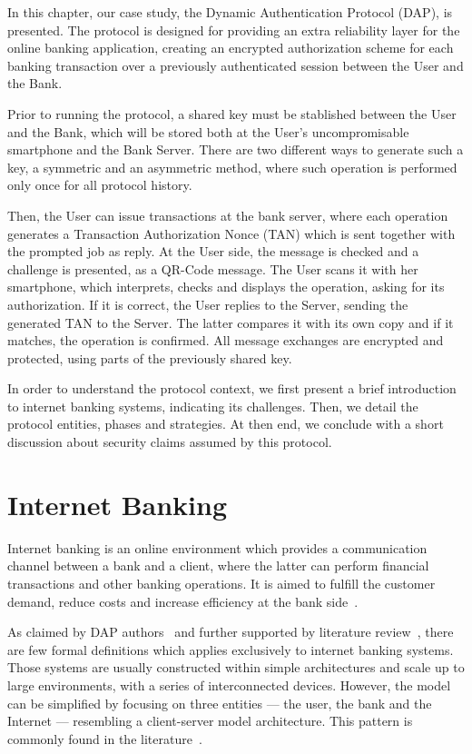 In this chapter\label{chap:dap}, our case study, the Dynamic Authentication Protocol (DAP), is presented. The protocol is designed for providing an extra reliability layer for the online banking application, creating an encrypted authorization scheme for each banking transaction over a previously authenticated session between the User and the Bank.

Prior to running the protocol, a shared key must be stablished between the User and the Bank, which will be stored both at the User's uncompromisable smartphone and the Bank Server. There are two different ways to generate such a key, a symmetric and an asymmetric method, where such operation is performed only once for all protocol history.

Then, the User can issue transactions at the bank server, where each operation generates a Transaction Authorization Nonce (TAN) which is sent together with the prompted job as reply. At the User side, the message is checked and a challenge is presented, as a QR-Code message. The User scans it with her smartphone, which interprets, checks and displays the operation, asking for its authorization. If it is correct, the User replies to the Server, sending the generated TAN to the Server. The latter compares it with its own copy and if it matches, the operation is confirmed. All message exchanges are encrypted and protected, using parts of the previously shared key.

In order to understand the protocol context, we first present a brief introduction to internet banking systems, indicating its challenges. Then, we detail the protocol entities, phases and strategies. At then end, we conclude with a short discussion about security claims assumed by this protocol.





\section{Internet Banking}
Internet banking is an online environment which provides a communication channel between a bank and a client, where the latter can perform financial transactions and other banking operations. It is aimed to fulfill the customer demand, reduce costs and increase efficiency at the bank side~\cite{Hutchinson2003}.

As claimed by DAP authors~\cite[p.8]{Peotta2012} and further supported by literature review~\cite{Hutchinson2003}, there are few formal definitions which applies exclusively to internet banking systems. Those systems are usually constructed within simple architectures and scale up to large environments, with a series of interconnected devices. However, the model can be simplified by focusing on three entities --- the user, the bank and the Internet --- resembling a client-server model architecture. This pattern is commonly found in the literature~\cite{Hutchinson2003}.

